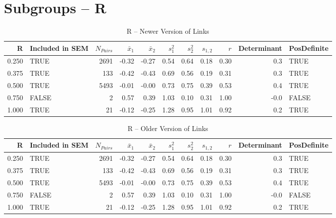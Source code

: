 \documentclass{article}\usepackage[]{graphicx}\usepackage[]{color}
\begin{document}
\section{Subgroups --  R }%
\begin{table}[ht]
\centering
\begin{tabular}{rlrrrrrrrrl}
  \hline
R & Included in SEM & $N_{Pairs}$ & $\bar{x}_1$ & $\bar{x}_2$ & $s_1^2$ & $s_2^2$ & $s_{1,2}$ & $r$ & Determinant & PosDefinite \\ 
  \hline
0.250 & TRUE & 2691 & -0.32 & -0.27 & 0.54 & 0.64 & 0.18 & 0.30 & 0.3 & TRUE \\ 
  0.375 & TRUE & 133 & -0.42 & -0.43 & 0.69 & 0.56 & 0.19 & 0.31 & 0.3 & TRUE \\ 
  0.500 & TRUE & 5493 & -0.01 & -0.00 & 0.73 & 0.75 & 0.39 & 0.53 & 0.4 & TRUE \\ 
  0.750 & FALSE & 2 & 0.57 & 0.39 & 1.03 & 0.10 & 0.31 & 1.00 & -0.0 & FALSE \\ 
  1.000 & TRUE & 21 & -0.12 & -0.25 & 1.28 & 0.95 & 1.01 & 0.92 & 0.2 & TRUE \\ 
   \hline
\end{tabular}
\caption{R -- Newer Version of Links} 
\end{table}
\begin{table}[ht]
\centering
\begin{tabular}{rlrrrrrrrrl}
  \hline
R & Included in SEM & $N_{Pairs}$ & $\bar{x}_1$ & $\bar{x}_2$ & $s_1^2$ & $s_2^2$ & $s_{1,2}$ & $r$ & Determinant & PosDefinite \\ 
  \hline
0.250 & TRUE & 2691 & -0.32 & -0.27 & 0.54 & 0.64 & 0.18 & 0.30 & 0.3 & TRUE \\ 
  0.375 & TRUE & 133 & -0.42 & -0.43 & 0.69 & 0.56 & 0.19 & 0.31 & 0.3 & TRUE \\ 
  0.500 & TRUE & 5493 & -0.01 & -0.00 & 0.73 & 0.75 & 0.39 & 0.53 & 0.4 & TRUE \\ 
  0.750 & FALSE & 2 & 0.57 & 0.39 & 1.03 & 0.10 & 0.31 & 1.00 & -0.0 & FALSE \\ 
  1.000 & TRUE & 21 & -0.12 & -0.25 & 1.28 & 0.95 & 1.01 & 0.92 & 0.2 & TRUE \\ 
   \hline
\end{tabular}
\caption{R -- Older Version of Links} 
\end{table}
\newpage 
\end{document}
